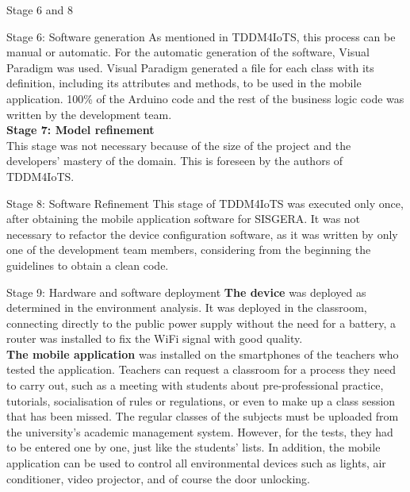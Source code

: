 \documentclass[notes=show, 10pt]{beamer}
\begin{document}
    \begin{frame}{Stage 6 and 8}
        \begin{block}{Stage 6: Software generation}
            As mentioned in TDDM4IoTS, this process can be manual or automatic. For the automatic generation of the software, Visual Paradigm was used. Visual Paradigm generated a file for each class with its definition, including its attributes and methods, to be used in the mobile application. 100\% of the Arduino code and the rest of the business logic code was written by the development team.\\
            \textbf{Stage 7: Model refinement}\\
            This stage was not necessary because of the size of the project and the developers' mastery of the domain. This is foreseen by the authors of TDDM4IoTS.
        \end{block}
        
        \begin{block}{Stage 8: Software Refinement}
            This stage of TDDM4IoTS was executed only once, after obtaining the mobile application software for SISGERA. It was not necessary to refactor the device configuration software, as it was written by only one of the development team members, considering from the beginning the guidelines to obtain a clean code.
        \end{block}
    \end{frame}
    
    \begin{frame}{Stage 9: Hardware and software deployment}
        \textbf{The device} was deployed as determined in the environment analysis. It was deployed in the classroom, connecting directly to the public power supply without the need for a battery, a router was installed to fix the WiFi signal with good quality.\\
        \textbf{The mobile application} was installed on the smartphones of the teachers who tested the application.
        Teachers can request a classroom for a process they need to carry out, such as a meeting with students about pre-professional practice, tutorials, socialisation of rules or regulations, or even to make up a class session that has been missed. The regular classes of the subjects must be uploaded from the university's academic management system. However, for the tests, they had to be entered one by one, just like the students' lists.
        In addition, the mobile application can be used to control all environmental devices such as lights, air conditioner, video projector, and of course the door unlocking.
    \end{frame}
    
\end{document}
